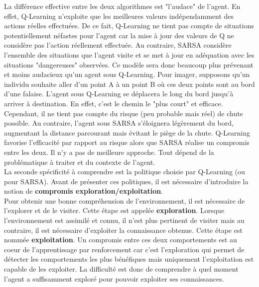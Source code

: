 \noindent La différence effective entre les deux algorithmes est "l'audace" de l'agent. En effet, Q-Learning n'exploite que les meilleures valeurs indépendamment des actions réelles effectuées. De ce fait, Q-Learning ne tient pas compte de situations potentiellement néfastes pour l'agent car la mise à jour des valeurs de Q ne considère pas l'action réellement effectuée. Au contraire, SARSA considère l'ensemble des situations que l'agent visite et se met à jour en adéquation avec les situations "dangereuses" observées. Ce modèle sera donc beaucoup plus prévenant et moins audacieux qu'un agent sous Q-Learning. Pour imager, supposons qu'un individu souhaite aller d'un point A à un point B où ces deux points sont au bord d'une falaise. L'agent sous Q-Learning se déplacera le long du bord jusqu'à arriver à destination. En effet, c'est le chemin le "plus court" et efficace. Cependant, il ne tient pas compte du risque (peu probable mais réel) de chute possible. Au contraire, l'agent sous SARSA s'éloignera légèrement du bord, augmentant la distance parcourant mais évitant le piège de la chute. Q-Learning favorise l'efficacité par rapport au risque alors que SARSA réalise un compromis entre les deux. Il n'y a pas de meilleure approche. Tout dépend de la problématique à traiter et du contexte de l'agent.\\

\noindent La seconde spécificité à comprendre est la politique choisie par Q-Learning (ou pour SARSA). Avant de présenter ces politiques, il est nécessaire d'introduire la notion de \textbf{compromis exploration/exploitation}.\\

\noindent Pour obtenir une bonne compréhension de l'environnement, il est nécessaire de l'explorer et de le visiter. Cette étape est appelée \textbf{exploration}. Lorsque l'environnement est assimilé et connu, il n'est plus pertinent de visiter mais au contraire, il est nécessaire d'exploiter la connaissance obtenue. Cette étape est nommée \textbf{exploitation}. Un compromis entre ces deux comportements est au coeur de l'apprentissage par renforcement car c'est l'exploration qui permet de détecter les comportements les plus bénéfiques mais uniquement l'exploitation est capable de les exploiter. La difficulté est donc de comprendre à quel moment l'agent a suffisamment exploré pour pouvoir exploiter ses connaissances.\\

